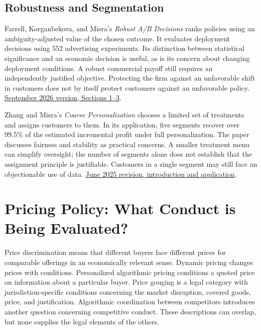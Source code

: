 \hypertarget{M09-robustness-and-segmentation}{%
\subsection{Robustness and
Segmentation}\label{M09-robustness-and-segmentation}}

\noindent Farrell, Korganbekova, and Misra's \emph{Robust A/B Decisions} ranks
policies using an ambiguity-adjusted value of the chosen outcome. It
evaluates deployment decisions using 552 advertising experiments. Its
distinction between statistical significance and an economic decision is
useful, as is its concern about changing deployment conditions. A robust
commercial payoff still requires an independently justified objective.
Protecting the firm against an unfavorable shift in customers does not
by itself protect customers against an unfavorable policy.
\href{https://arxiv.org/abs/2609.07633}{September 2026 version, Sections
1--3}.

Zhang and Misra's \emph{Coarse Personalization} chooses a limited set of
treatments and assigns customers to them. In its application, five
segments recover over 99.5\% of the estimated incremental profit under
full personalization. The paper discusses fairness and stability as
practical concerns. A smaller treatment menu can simplify oversight; the
number of segments alone does not establish that the assignment
principle is justifiable. Customers in a single segment may still face
an objectionable use of data.
\href{https://arxiv.org/abs/2204.05793v4}{June 2025 revision,
introduction and application}.


\hypertarget{M09-pricing-policy-what-conduct-is-being-evaluated}{%
\section{Pricing Policy: What Conduct is Being
Evaluated?}\label{M09-pricing-policy-what-conduct-is-being-evaluated}}

\noindent Price discrimination means that different buyers face different prices
for comparable offerings in an economically relevant sense. Dynamic
pricing changes prices with conditions. Personalized algorithmic pricing
conditions a quoted price on information about a particular buyer. Price
gouging is a legal category with jurisdiction-specific conditions
concerning the market disruption, covered goods, price, and
justification. Algorithmic coordination between competitors introduces
another question concerning competitive conduct. These descriptions can
overlap, but none supplies the legal elements of the others.

